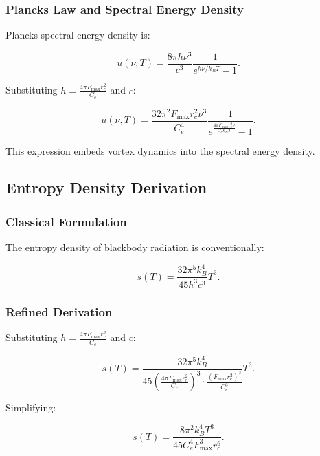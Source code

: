   \subsubsection*{Planck\rqs s Law and Spectral Energy Density}
  Planck\rqs s spectral energy density is:

  \begin{equation*}
   u(\nu, T) = \frac{8 \pi h \nu^3}{c^3} \frac{1}{e^{h \nu / k_B T} - 1}.
  \end{equation*}

  Substituting $h = \frac{4 \pi F_{\max} r_c^2}{C_e}$ and $c$:

  \begin{equation*}
   u(\nu, T) = \frac{32 \pi^2 F_{\max} r_c^2 \nu^3}{C_e^4} \frac{1}{e^{\frac{4 \pi F_{\max} r_c^2 \nu}{C_e k_B T}} - 1}.
  \end{equation*}

  This expression embeds vortex dynamics into the spectral energy density.

  \subsection*{Entropy Density Derivation}

  \subsubsection*{Classical Formulation}
  The entropy density of blackbody radiation is conventionally:

  \begin{equation*}
   s(T) = \frac{32 \pi^5 k_B^4}{45 h^3 c^3} T^3.
  \end{equation*}

  \subsubsection*{Refined Derivation}
  Substituting $h = \frac{4 \pi F_{\max} r_c^2}{C_e}$ and $c$:

  \begin{equation*}
   s(T) = \frac{32 \pi^5 k_B^4}{45 \left(\frac{4 \pi F_{\max} r_c^2}{C_e}\right)^3 \cdot \frac{(F_{\max} r_c^2)^3}{C_e^3}} T^3.
  \end{equation*}

  Simplifying:

  \begin{equation*}
   s(T) = \frac{8 \pi^2 k_B^4 T^3}{45 C_e^4 F_{\max}^3 r_c^6}.
  \end{equation*}

